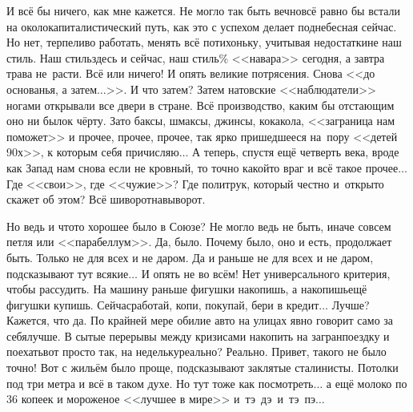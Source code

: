 И всё бы ничего, как мне кажется. Не могло так быть вечно\mdash всё равно бы встали на околокапиталистический путь, как это с успехом делает поднебесная сейчас. Но нет, терпеливо работать, менять всё потихоньку, учитывая недостатки\mdash не наш стиль. Наш стиль\mdash здесь и сейчас, наш стиль\% <<навара>> сегодня, а завтра трава не~расти. Всё или ничего! И опять великие потрясения. Снова <<до основанья, а затем$\ldots$>>. И что затем? Затем натовские <<наблюдатели>> ногами открывали все двери в стране. Всё производство, каким бы отстающим оно ни было\mdash к чёрту. Зато баксы, шмаксы, джинсы, кока\sdash кола, <<заграница нам поможет>> и прочее, прочее, прочее, так ярко пришедшееся на~пору <<детей 90\sdash х>>, к которым себя причисляю$\ldots$ А теперь, спустя ещё четверть века, вроде как Запад нам снова если не кровный, то точно какой\sdash то враг и всё такое прочее$\ldots$ Где <<свои>>, где <<чужие>>? Где политрук, который честно и~открыто скажет об этом? Всё шиворот\sdash навыворот.

Но ведь и что\sdash то хорошее было в Союзе? Не могло ведь не быть, иначе совсем петля или <<парабеллум>>. Да, было. Почему было, оно и есть, продолжает быть. Только не для всех и не даром. Да и раньше не для всех и не даром, подсказывают тут всякие$\ldots$
И опять не во всём! Нет универсального критерия, чтобы рассудить. На машину раньше фигушки накопишь, а накопишь\mdash ещё фигушки купишь. Сейчас\mdash работай, копи, покупай, бери в кредит$\ldots$ Лучше? Кажется, что да. По крайней мере обилие авто на улицах явно говорит само за себя\mdash лучше. В сытые перерывы между кризисами накопить на загранпоездку и поехать\mdash вот просто так, на недельку\mdash реально? Реально. Привет, такого не было точно! 
Вот с жильём было проще, подсказывают заклятые сталинисты. Потолки под три метра и всё в таком духе. Но тут тоже как посмотреть$\ldots$ а ещё молоко по 36 копеек и мороженое <<лучшее в мире>> и~тэ~дэ~и~тэ~пэ$\ldots$ 

